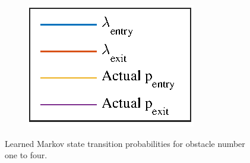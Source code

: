 \begin{figure}[htbp]
	\hspace*{\fill}
	\begin{subfigure}[t]{0.5\linewidth}
		\centering
		\includegraphics[scale = 1]{chapters/appendix/figures/learning_curves/legend}
		
	\end{subfigure}
	\hspace*{\fill}

	\caption{Learned Markov state transition probabilities for obstacle number one to four.}
	\label{fig:all_learnings_sim_1}
\end{figure}

